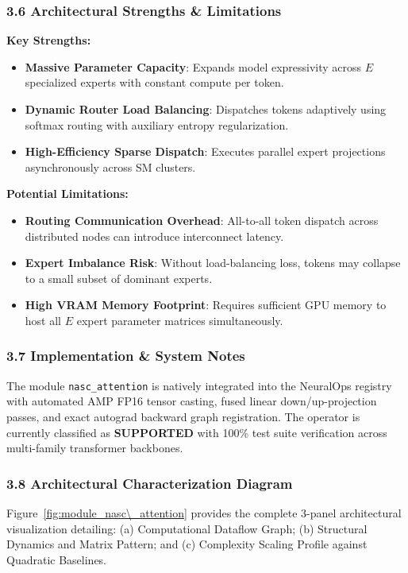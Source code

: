 \subsubsection*{3.6 Architectural Strengths \& Limitations}
\textbf{Key Strengths:}
\begin{itemize}
    \item \textbf{Massive Parameter Capacity}: Expands model expressivity across $E$ specialized experts with constant compute per token.
    \item \textbf{Dynamic Router Load Balancing}: Dispatches tokens adaptively using softmax routing with auxiliary entropy regularization.
    \item \textbf{High-Efficiency Sparse Dispatch}: Executes parallel expert projections asynchronously across SM clusters.
\end{itemize}

\textbf{Potential Limitations:}
\begin{itemize}
    \item \textbf{Routing Communication Overhead}: All-to-all token dispatch across distributed nodes can introduce interconnect latency.
    \item \textbf{Expert Imbalance Risk}: Without load-balancing loss, tokens may collapse to a small subset of dominant experts.
    \item \textbf{High VRAM Memory Footprint}: Requires sufficient GPU memory to host all $E$ expert parameter matrices simultaneously.
\end{itemize}

\subsubsection*{3.7 Implementation \& System Notes}
The module \texttt{nasc\_attention} is natively integrated into the NeuralOps registry with automated AMP FP16 tensor casting, fused linear down/up-projection passes, and exact autograd backward graph registration. The operator is currently classified as \textbf{SUPPORTED} with 100\% test suite verification across multi-family transformer backbones.

\subsubsection*{3.8 Architectural Characterization Diagram}
Figure~\ref{fig:module_nasc\_attention} provides the complete 3-panel architectural visualization detailing: (a) Computational Dataflow Graph; (b) Structural Dynamics and Matrix Pattern; and (c) Complexity Scaling Profile against Quadratic Baselines.

